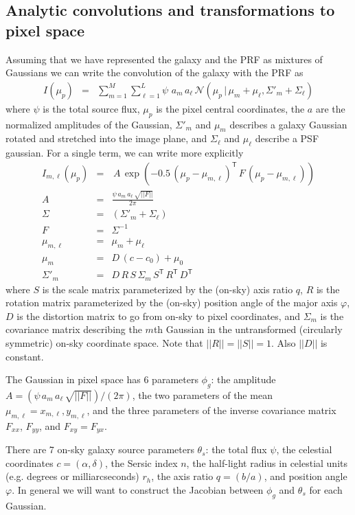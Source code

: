 \documentclass[modern]{aastex62}
\newcommand{\transpose}[1]{{#1}^{\!\mathsf T}}
\newcommand{\given}{\,|\,}
\renewcommand{\det}[1]{||{#1}||}
\newcommand{\normal}{\mathcal{N}}
\begin{document}
\subsection{Analytic convolutions and transformations to pixel space}
Assuming that we have represented the galaxy and the PRF as mixtures of Gaussians we can write the convolution of the galaxy with the PRF as
\begin{eqnarray}
I(\mu_p) & = & \sum_{m=1}^M \sum_{\ell=1}^L \psi \, \, a_m \, a_\ell \, \normal(\mu_p \given \mu_m + \mu_\ell, \Sigma'_m + \Sigma_\ell)
\end{eqnarray}
where $\psi$ is the total source flux,
$\mu_p$ is the pixel central coordinates,
the $a$ are the normalized amplitudes of the Gaussian,
$\Sigma'_m$  and $\mu_m$ describes a galaxy Gaussian rotated and stretched into the image plane,
and $\Sigma_\ell$ and $\mu_\ell$ describe a PSF gaussian.
For a single term, we can write more explicitly
\begin{eqnarray}
I_{m, \ell}(\mu_p) & = & \, A  \, \exp(-0.5 \, \transpose{(\mu_p -\mu_{m,\ell})} \, F \, (\mu_p -\mu_{m,\ell})) \\
A & = & \frac{ \psi \, a_m \, a_\ell \, \sqrt{\det{F}}}{2\pi} \\
\Sigma & = & (\Sigma'_m + \Sigma_\ell) \nonumber \\
 F & = & \Sigma^{-1} \nonumber \\
\mu_{m,\ell} & = & \mu_m + \mu_\ell \nonumber \\
\mu_m & = & D\, (c - c_0) + \mu_0 \nonumber \\  
\Sigma'_m & = & D\, R \, S \, \Sigma_m \, \transpose{S} \, \transpose{R} \, \transpose{D}\nonumber 
\end{eqnarray}
where $S$ is the scale matrix parameterized by the (on-sky) axis ratio $q$,
$R$ is the rotation matrix parameterized by the (on-sky) position angle of the major axis $\varphi$, 
$D$ is the distortion matrix to go from on-sky to pixel coordinates,
and $\Sigma_m$ is the covariance matrix describing the $m$th Gaussian in the untransformed (circularly symmetric) on-sky coordinate space.
Note that $\det{R}=\det{S}=1$.
Also $\det{D}$ is constant.

The Gaussian in pixel space has 6 parameters $\phi_g$:
the amplitude $A = (\psi \, a_m \, a_\ell \, \sqrt{\det{F}})/(2\pi)$,
the two parameters of the mean $\mu_{m,\ell} = x_{m, \ell}, y_{m, \ell}$,
and the three parameters of the inverse covariance matrix $F_{xx}$,
$F_{yy}$,
and $F_{xy}=F_{yx}$.

There are 7 on-sky galaxy source parameters $\theta_s$:
the total flux $\psi$,
the celestial coordinates $c= (\alpha, \delta)$,
the Sersic index $n$, 
the half-light radius in  celestial units (e.g. degrees or milliarcseconds) $r_h$,
the axis ratio $q = (b/a)$,
and position angle $\varphi$.
In general we will want to construct the Jacobian between $\phi_g$ and $\theta_s$ for each Gaussian.
\end{document}
